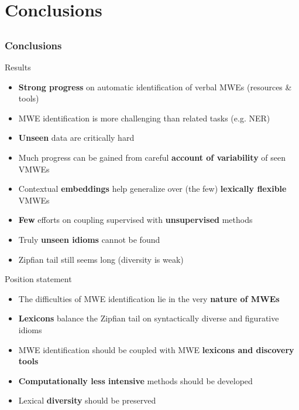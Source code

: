 \documentclass[xcolor=dvipsnames]{beamer}
\begin{document}
\begin{frame}
\begin{frame}
\begin{scriptsize}
\end{scriptsize}

\end{frame}


\section{Conclusions}  
\subsection{}

\begin{frame}
   \frametitle{Conclusions}

\begin{scriptsize}
\begin{block}{Results}
\begin{itemize}
\item \textbf{Strong progress} on automatic identification of verbal MWEs (resources \& tools)
\item MWE identification is more challenging than related tasks (e.g. NER)
\item \textbf{Unseen} data are critically hard
\item Much progress can be gained from careful \textbf{account of variability} of seen VMWEs
\item Contextual \textbf{embeddings} help generalize over (the few) \textbf{lexically flexible} VMWEs
\item \textbf{Few} efforts on coupling supervised with \textbf{unsupervised} methods
\item Truly \textbf{unseen idioms} cannot be found
\item Zipfian tail still seems long (diversity is weak)
\end{itemize}
\end{block}

\begin{block}{Position statement}
\begin{itemize}
\item The difficulties of MWE identification lie in the very \textbf{nature of MWEs}
\item \textbf{Lexicons} balance the Zipfian tail on syntactically diverse and figurative idioms
\item MWE identification should be coupled with MWE \textbf{lexicons and discovery tools}
\item \textbf{Computationally less intensive} methods should be developed
\item Lexical \textbf{diversity} should be preserved
\end{itemize}
\end{block}


\end{scriptsize}
\end{frame}
\end{frame}
\end{document}
